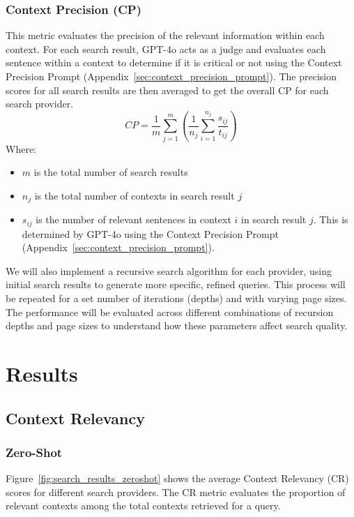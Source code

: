 \documentclass{article}
\begin{document}
\begin{multicols}{2}
\subsubsection{Context Precision (CP)}
This metric evaluates the precision of the relevant information within each context. For each search result, GPT-4o acts as a judge and evaluates each sentence within a context to determine if it is critical or not using the Context Precision Prompt (Appendix~\ref{sec:context_precision_prompt}). The precision scores for all search results are then averaged to get the overall CP for each search provider.
\begin{equation}
CP = \frac{1}{m} \sum_{j=1}^{m} \left( \frac{1}{n_j} \sum_{i=1}^{n_j} \frac{s_{ij}}{t_{ij}} \right)
\end{equation}
Where:
\begin{itemize}
    \item $m$ is the total number of search results
    \item $n_j$ is the total number of contexts in search result $j$
    \item $s_{ij}$ is the number of relevant sentences in context $i$ in search result $j$. This is determined by GPT-4o using the Context Precision Prompt (Appendix~\ref{sec:context_precision_prompt}).
\end{itemize}

We will also implement a recursive search algorithm for each provider, using initial search results to generate more specific, refined queries. This process will be repeated for a set number of iterations (depths) and with varying page sizes. The performance will be evaluated across different combinations of recursion depths and page sizes to understand how these parameters affect search quality.

\section{Results}

\subsection{Context Relevancy}
\subsubsection{Zero-Shot}
Figure~\ref{fig:search_results_zeroshot} shows the average Context Relevancy (CR) scores for different search providers. The CR metric evaluates the proportion of relevant contexts among the total contexts retrieved for a query.


\end{multicols}
\end{document}
